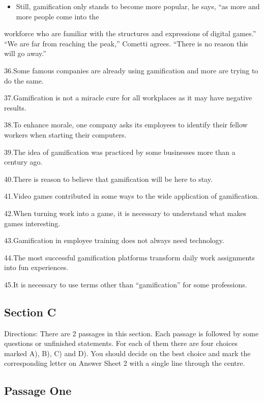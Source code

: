 \documentclass[UTF8,11pt]{ctexart}
\begin{document}
\begin{itemize}[leftmargin=2em,itemsep=.2em,topsep=.4em]\item[K.] Still, gamification only stands to become more popular, he says, “as more and more people come into the
\end{itemize}

workforce who are familiar with the structures and expressions of digital games.” “We are far from reaching the peak,” Cometti agrees. “There is no reason this will go away.”


36.Some famous companies are already using gamification and more are trying to do the same.


37.Gamification is not a miracle cure for all workplaces as it may have negative results.


38.To enhance morale, one company asks its employees to identify their fellow workers when starting their computers.


39.The idea of gamification was practiced by some businesses more than a century ago.


40.There is reason to believe that gamification will be here to stay.


41.Video games contributed in some ways to the wide application of gamification.


42.When turning work into a game, it is necessary to understand what makes games interesting.


43.Gamification in employee training does not always need technology.


44.The most successful gamification platforms transform daily work assignments into fun experiences.


45.It is necessary to use terms other than “gamification” for some professions.


\subsection*{\textbf{Section C}}


Directions: There are 2 passages in this section. Each passage is followed by some questions or unfinished statements. For each of them there are four choices marked A), B), C) and D). You should decide on the best choice and mark the corresponding letter on Answer Sheet 2 with a single line through the centre.


\subsection*{\textbf{Passage One}}
\end{document}
